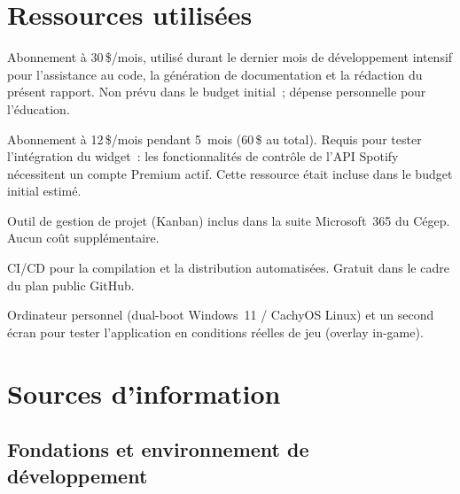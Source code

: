 \documentclass[12pt,a4paper]{article}
\begin{document}
\section{Ressources utilisées}

\begin{description}[leftmargin=2cm, style=nextline]
  \item[\normalfont\textbf{Claude Code (Anthropic)}]
    Abonnement à 30\,\$/mois, utilisé durant le dernier mois de
    développement intensif pour l'assistance au code, la génération de
    documentation et la rédaction du présent rapport. Non prévu dans le
    budget initial~; dépense personnelle pour l'éducation.

  \item[\normalfont\textbf{Spotify Premium}]
    Abonnement à 12\,\$/mois pendant 5~mois (60\,\$ au total). Requis
    pour tester l'intégration du widget~: les fonctionnalités de contrôle
    de l'API Spotify nécessitent un compte Premium actif. Cette ressource
    était incluse dans le budget initial estimé.

  \item[\normalfont\textbf{Microsoft Planner}]
    Outil de gestion de projet (Kanban) inclus dans la suite Microsoft~365
    du Cégep. Aucun coût supplémentaire.

  \item[\normalfont\textbf{GitHub Actions}]
    CI/CD pour la compilation et la distribution automatisées. Gratuit
    dans le cadre du plan public GitHub.

  \item[\normalfont\textbf{Matériel}]
    Ordinateur personnel (dual-boot Windows~11 / CachyOS Linux) et
    un second écran pour tester l'application en conditions réelles de
    jeu (overlay in-game).
\end{description}

\section{Sources d'information}

\subsection{Fondations et environnement de développement}
\end{document}
